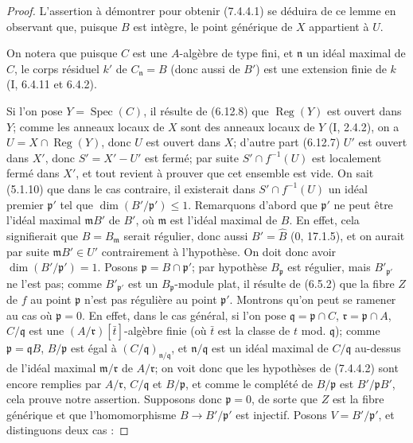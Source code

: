 \begin{proof}
L'assertion à démontrer pour obtenir (7.4.4.1) se déduira de ce lemme en
observant que, puisque $B$ est intègre, le point générique de $X$ appartient
à $U$.

On notera que puisque $C$ est une $A$-algèbre de type fini, et $\mathfrak n$
un idéal maximal de $C$, le corps résiduel $k'$ de
$C_{\mathfrak n}=B$ (donc aussi de $B'$) est une extension finie de $k$
(I, 6.4.11 et 6.4.2).

Si l'on pose $Y=\operatorname{Spec}(C)$, il résulte de (6.12.8) que
$\operatorname{Reg}(Y)$ est ouvert dans $Y$; comme les anneaux locaux de
$X$ sont des anneaux locaux de $Y$ (I, 2.4.2), on a
$U=X\cap\operatorname{Reg}(Y)$, donc $U$ est ouvert dans $X$; d'autre part
(6.12.7) $U'$ est ouvert dans $X'$, donc $S'=X'-U'$ est fermé; par suite
$S'\cap f^{-1}(U)$ est localement fermé dans $X'$, et tout revient à
prouver que cet ensemble est vide. On sait (5.1.10) que dans le cas
contraire, il existerait dans $S'\cap f^{-1}(U)$ un idéal premier
$\mathfrak p'$ tel que $\dim(B'/\mathfrak p')\leqslant1$. Remarquons d'abord
que $\mathfrak p'$ ne peut être l'idéal maximal $\mathfrak mB'$ de $B'$,
où $\mathfrak m$ est l'idéal maximal de $B$. En effet, cela signifierait que
$B=B_{\mathfrak m}$ serait régulier, donc aussi $B'=\widehat B$ (0,
17.1.5), et on aurait par suite $\mathfrak mB'\in U'$ contrairement à
l'hypothèse. On doit donc avoir $\dim(B'/\mathfrak p')=1$. Posons
$\mathfrak p=B\cap\mathfrak p'$; par hypothèse $B_{\mathfrak p}$ est
régulier, mais $B'_{\mathfrak p'}$ ne l'est pas; comme
$B'_{\mathfrak p'}$ est un $B_{\mathfrak p}$-module plat, il résulte de
(6.5.2) que la fibre $Z$ de $f$ au point $\mathfrak p$ n'est pas régulière
au point $\mathfrak p'$. Montrons qu'on peut se ramener au cas où
$\mathfrak p=0$. En effet, dans le cas général, si l'on pose
$\mathfrak q=\mathfrak p\cap C$, $\mathfrak r=\mathfrak p\cap A$,
$C/\mathfrak q$ est une $(A/\mathfrak r)[\bar t]$-algèbre finie (où
$\bar t$ est la classe de $t$ mod. $\mathfrak q$); comme
$\mathfrak p=\mathfrak qB$, $B/\mathfrak p$ est égal à
$(C/\mathfrak q)_{\mathfrak n/\mathfrak q}$, et
$\mathfrak n/\mathfrak q$ est un idéal maximal de $C/\mathfrak q$
au-dessus de l'idéal maximal $\mathfrak m/\mathfrak r$ de
$A/\mathfrak r$; on voit donc que les hypothèses de (7.4.4.2) sont encore
remplies par $A/\mathfrak r$, $C/\mathfrak q$ et $B/\mathfrak p$, et comme
le complété de $B/\mathfrak p$ est $B'/\mathfrak pB'$, cela prouve notre
assertion. Supposons donc $\mathfrak p=0$, de sorte que $Z$ est la fibre
générique et que l'homomorphisme $B\to B'/\mathfrak p'$ est injectif.
Posons $V=B'/\mathfrak p'$, et distinguons deux cas :


\end{proof}
